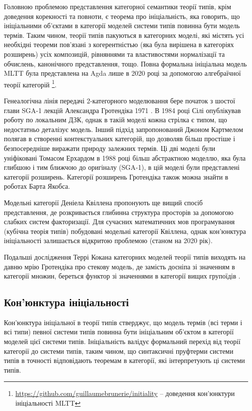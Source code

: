 Головною проблемою представлення категорної семантики теорії типів, крім доведення корекності та повноти,
є теорема про ініціальність, яка говорить, що ініціальними об'єктами в категорії моделей системи типів повинна бути модель термів.
Таким чином, теорії типів пакуються в категорних моделі, які містять усі
необхідні теореми пов'язані з когерентністью (яка була вирішена в категоріях розширень\cite{Lumsdaine15}) усіх композицій, рівняннями та властивостями
нормалізації та обчислень, канонічного представлення, тощо. Повна формальна ініціальна модель MLTT була
представлена на Agda лише в 2020 році за допомогою алгебраїчної теорії
категорій \footnote{\url{https://github.com/guillaumebrunerie/initiality} -- доведення кон'юнктури ініціальності MLTT}.

Генеалогічна лінія передачі 2-категорного моделювання бере початок з шостої глави SGA-1 лекцій Александра Гротендіка 1971 \cite{SGA1}.
В 1984 році Сілі \cite{Seely84} опублікував роботу по локальним ДЗК, однак в такій моделі кожна
стрілка є типом, що недостатньо деталізує модель. Інший підхід запропонований Джоном Картмелом \cite{Cartmell86} полягав
в створенні контекстуальних категорій, що дозволяв більш простіше і безпосередніше виражати природу залежних термів.
Ці дві моделі були уніфіковані Томасом Ерхардом в 1988 році \cite{Ehrhard88} більш абстрактною моделлю,
яка була глибшою і тим ближчою до оригіналу (SGA-1), в цій моделі були представлені категорії розширень.
Категорії розширень Гротендіка також можна знайти в роботах Барта Якобса\cite{Jacobs93}\cite{Jacobs99}.

Модельні категорії Деніела Квіллена \cite{Quillen67} пропонують ще вищий спосіб представлення,
де розкривається глибинна структура просторів за допомогою слабких систем факторизації.
Для сучасних математичних мов програмування (кубічна теорія типів) побудовані модельні категорії Квіллена,
однак кон'юнктура ініціальності залишається відкритою проблемою (станом на 2020 рік).

Подальші дослідження Террі Кокана категорних моделей теорії типів виходять на давню мрію
Гротендіка про стекову модель, де замість досніпа зі значенням в категорії множин,
береться функтор зі значеннями в категорії вищих групоїдів \cite{Coquand17Stack}.

\subsection*{Кон'юнктура ініціальності}
Кон'юнктура ініціальної в теорії типів стверджує, що модель термів (всі терми і всі типи)
певної системи типів повинна бути ініціальним об'єктом в категорії моделей цієї
системи типів. Ініціальність валідує формальний перехід від теорії категорії до
системи типів, таким чином, що синтаксичні пруфтерми системи типів в точності
відповідають теоремам в категорії, які інтерпретують ці системи типів.

